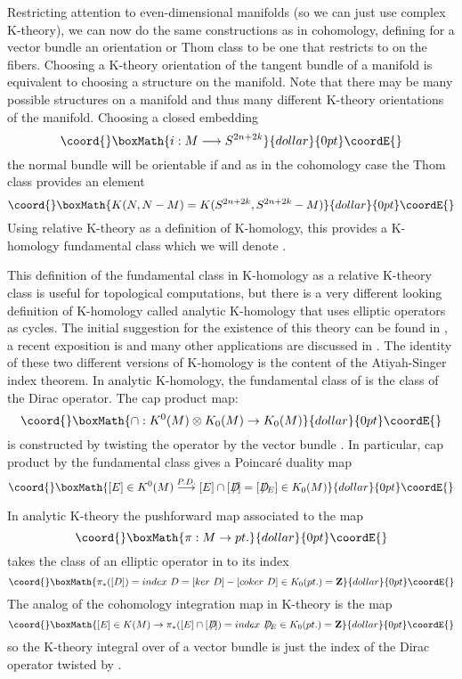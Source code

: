 \documentclass[a4paper,a4paper]{article}
\theoremstyle{conjecture}
\def\Slash#1{#1\!\!\!\!/}
\def\Dirac{\Slash D}
\begin{document}
Restricting attention to even-dimensional manifolds \coordHE{}
(so we can just use complex K-theory), we can now do the same constructions as in cohomology, defining
for a vector bundle \coordHE{} an orientation or Thom class \coordHE{} to be one
that restricts to \myHighlight{$\Omega$}\coordHE{} on the fibers.  Choosing a K-theory orientation of the tangent bundle \coordHE{} of a manifold
is equivalent to choosing a \coordHE{} structure on the manifold. Note that there may be many possible \coordHE{}
structures on a manifold and thus many different K-theory orientations of the manifold.  Choosing a 
closed embedding
$$\coord{}\boxMath{i:M\longrightarrow S^{2n+2k}}{dollar}{0pt}\coordE{}$$
the normal bundle \coordHE{} will be orientable if \coordHE{} and as in the cohomology case
the Thom class \coordHE{} provides an element
$$\coord{}\boxMath{K(N, N-M)=K(S^{2n+2k},S^{2n+2k}-M)}{dollar}{0pt}\coordE{}$$
Using relative K-theory as a definition of K-homology, this provides a K-homology fundamental class
which we will denote \coordHE{}.


This definition of the fundamental class in K-homology as a relative K-theory class is useful
for topological computations, but there is a very different looking
definition of K-homology called analytic K-homology that uses elliptic operators as cycles. 
The initial suggestion for the existence of this theory can be found in \cite{Atiyah1}, a recent
exposition is \cite{Higson-Roe} and many other applications are discussed in \cite{Connes}.
The identity
of these two different versions of K-homology is the content of the Atiyah-Singer
index theorem.  In analytic K-homology, the fundamental class of \coordHE{}
is the class of the Dirac operator.  The cap product map:
$$\coord{}\boxMath{\cap :K^0(M)\otimes K_0(M) \rightarrow K_0(M)}{dollar}{0pt}\coordE{}$$
is constructed by twisting the operator by the vector bundle \coordHE{}.  In particular,
cap product by the fundamental class \myHighlight{$\{M\}=[\Dirac]$}\coordHE{} gives a Poincar\'e duality map
$$\coord{}\boxMath{[E]\in K^0(M)\stackrel{P.D.}\longrightarrow [E]\cap [\Dirac] =[\Dirac _E]\in K_0(M)}{dollar}{0pt}\coordE{}$$

In analytic K-theory the pushforward map \myHighlight{$\pi_*$}\coordHE{} associated to the map
$$\coord{}\boxMath{\pi: M \rightarrow pt.}{dollar}{0pt}\coordE{}$$
takes the class of an elliptic operator \coordHE{} in \coordHE{} to its index
$$\coord{}\boxMath{\pi_*([D])=index\ D=[ker\ D] - [coker\ D]\in K_0(pt.)= \mathbf Z}{dollar}{0pt}\coordE{}$$
The analog of the cohomology integration map \coordHE{} in K-theory is
the map
$$\coord{}\boxMath{ [E]\in K(M)\rightarrow \pi_*([E]\cap [\Dirac]) =index\ \Dirac _E \in K_0(pt.)=\mathbf Z}{dollar}{0pt}\coordE{}$$
so the K-theory integral over \coordHE{} of a vector bundle \coordHE{} is just the index of the Dirac
operator twisted by \coordHE{}.
\end{document}
